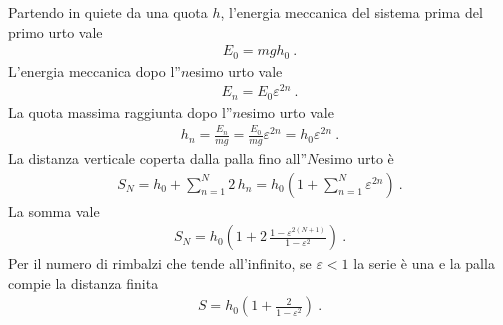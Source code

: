 \documentclass[letterpaper,10pt,italian]{jupyterBook}
\begin{document}
\sphinxAtStartPar
Partendo in quiete da una quota \(h\), l’energia meccanica del sistema prima del primo urto vale
\begin{equation*}
\begin{split}E_0 = m g h_0 \ .\end{split}
\end{equation*}
\sphinxAtStartPar
L’energia meccanica dopo l”\(n\)\sphinxhyphen{}esimo urto vale
\begin{equation*}
\begin{split}E_n = E_0 \varepsilon^{2n} \ .\end{split}
\end{equation*}
\sphinxAtStartPar
La quota massima raggiunta dopo l”\(n\)\sphinxhyphen{}esimo urto vale
\begin{equation*}
\begin{split}h_n = \frac{E_n}{mg} = \frac{E_0}{mg} \varepsilon^{2n} = h_0 \varepsilon^{2n} \ .\end{split}
\end{equation*}
\sphinxAtStartPar
La distanza verticale coperta dalla palla fino all”\(N\)\sphinxhyphen{}esimo urto è
\begin{equation*}
\begin{split}S_N = h_0 + \sum_{n=1}^{N} 2 \, h_n = h_0 \left( 1 + \sum_{n=1}^N \varepsilon^{2n} \right) \ .\end{split}
\end{equation*}
\sphinxAtStartPar
La somma vale
\begin{equation*}
\begin{split}S_N = h_0 \left( 1 + 2 \, \frac{1 - \varepsilon^{2(N+1)}}{1-\varepsilon^{2}} \right) \ .\end{split}
\end{equation*}
\sphinxAtStartPar
Per il numero di rimbalzi che tende all’infinito, se \(\varepsilon < 1\) la serie è una  e la palla compie la distanza finita
\begin{equation*}
\begin{split}S = h_0 \left( 1 + \frac{2}{1-\varepsilon^{2}} \right) \ .\end{split}
\end{equation*}
\end{document}
